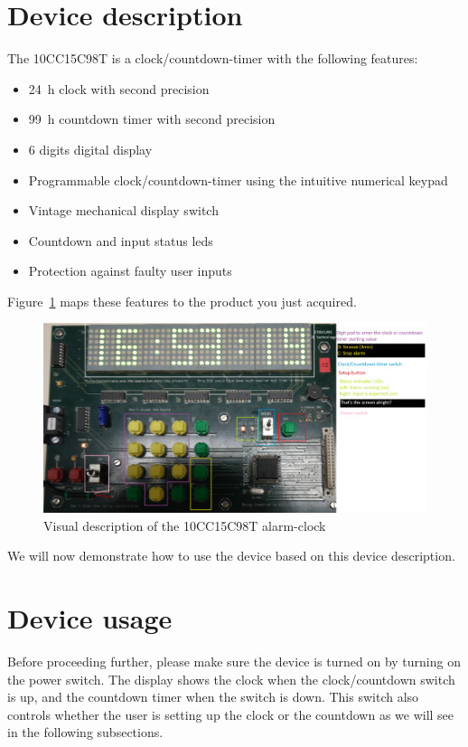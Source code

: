 


\maketitle
\hypersetup{allcolors=black}
\tableofcontents
\hypersetup{allcolors=link}

\section{Device description}
The 10CC15C98T is a clock/countdown-timer with the following features:
\begin{itemize}
    \item \SI{24}{\hour} clock with second precision
    \item \SI{99}{\hour} countdown timer with second precision
    \item 6 digits digital display
    \item Programmable clock/countdown-timer using the intuitive numerical keypad
    \item Vintage mechanical display switch
    \item Countdown and input status leds
    \item Protection against faulty user inputs
\end{itemize}

Figure~\ref{fig:board} maps these features to the product you just acquired.
\begin{figure}[htbp]
    \centerline{%
    \includegraphics[width=1.1\textwidth]{board.jpg}}
    \caption{Visual description of the 10CC15C98T alarm-clock\label{fig:board}}
\end{figure}
We will now demonstrate how to use the device based on this device description.

\section{Device usage}
Before proceeding further, please make sure the device is turned on by turning on the power switch.
The display shows the clock when the clock/countdown switch is up, and the countdown timer when the switch is down. This switch also controls whether the user is setting up the clock or the countdown as we will see in the following subsections.

